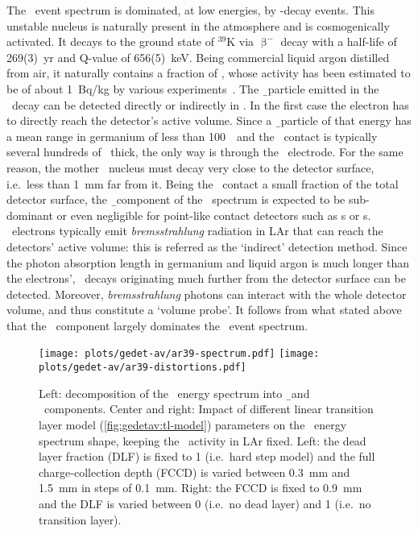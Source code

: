 The \gerda\ event spectrum is dominated, at low energies, by \Arl-decay events. This
unstable nucleus is naturally present in the atmosphere and is cosmogenically activated.
It decays to the ground state of $^{39}$K via $\upbeta^-$ decay with a half-life of
269(3)~yr and Q-value of 656(5)~keV. Being commercial liquid argon distilled from air, it
naturally contains a fraction of \Arl, whose activity has been estimated to be of about
1~Bq/kg by various experiments~\cite{Ajaj2019, Calvo2017, Benetti2006, Loosli1983}.
\newpar
The \b\ particle emitted in the \Arl\ decay can be detected directly or indirectly in
\gerda. In the first case the electron has to directly reach the detector's active volume.
Since a \b\ particle of that energy has a mean range in germanium of less than 100~\mum\
and the \nplus\ contact is typically several hundreds of \mum\ thick, the only way is
through the \pplus\ electrode. For the same reason, the mother \Arl\ nucleus must decay
very close to the detector surface, i.e.~less than 1~mm far from it. Being the \pplus\
contact a small fraction of the total detector surface, the \b\ component of the \Arl\
spectrum is expected to be sub-dominant or even negligible for point-like contact
detectors such as \bege{}s or \icoax{}s.
\newpar
\Arl\ electrons typically emit \emph{bremsstrahlung} radiation in LAr that can reach the
detectors' active volume: this is referred as the `indirect' detection method. Since the
photon absorption length in germanium and liquid argon is much longer than the electrons',
\Arl\ decays originating much further from the detector surface can be detected. Moreover,
\emph{bremsstrahlung} photons can interact with the whole detector volume, and thus
constitute a `volume probe'. It follows from what stated above that the \g\ component
largely dominates the \Arl\ event spectrum.

\begin{figure}
  \centering
  \texttt{[image: plots/gedet-av/ar39-spectrum.pdf]}%
  \texttt{[image: plots/gedet-av/ar39-distortions.pdf]}
  \caption{%
    Left: decomposition of the \Arl\ energy spectrum into \b\ and \g\ components. Center
    and right: Impact of different linear transition layer model
    (\cref{fig:gedetav:tl-model}) parameters on the \Arl\ energy spectrum shape, keeping
    the \Arl\ activity in LAr fixed. Left: the dead layer fraction (DLF) is fixed to 1
    (i.e.~hard step model) and the full charge-collection depth (FCCD) is varied between
    0.3~mm and 1.5~mm in steps of 0.1~mm. Right: the FCCD is fixed to 0.9~mm and the DLF
    is varied between 0 (i.e.~no dead layer) and 1 (i.e.~no transition layer).
  }\label{fig:gedetav:ar39:distortions}
\end{figure}

